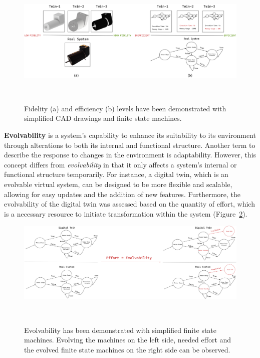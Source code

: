 \documentclass{llncs}
\begin{document}
    \begin{figure}[htbp]
        \centering
        \includegraphics[width = 1\textwidth]{Efficiency and Fidelity.png}
        \caption{Fidelity (a) and efficiency (b) levels have been demonstrated with simplified CAD drawings and 
        finite state machines.}~\label{fig:EfficiencyandFidelity}
    \end{figure}
 
    \textbf{Evolvability} is a system's capability to enhance its suitability to its environment through alterations to both its internal and functional 
    structure\cite{MobusSystemTheory}. Another term to describe the response to changes in the environment is adaptability.
    However, this concept differs from \textit{evolvability} in that it only affects a system's internal or functional structure temporarily. 
    For instance, a digital twin, which is an evolvable virtual system, can be designed to be more flexible and scalable, 
    allowing for easy updates and the addition of new features\cite{ZHANGUPDATEMETHOD}. 
    Furthermore, the evolvability of the digital twin was assessed based on the quantity of effort, which is a necessary resource to initiate transformation
    within the system (Figure~\ref{fig:Evolvability}). 

    \begin{figure}[htbp]
        \includegraphics[width = 1\textwidth]{Evolvability.png}
        \caption{Evolvability has been demonstrated with simplified finite state machines. 
        Evolving the machines on the left side, needed effort 
        and the evolved finite state machines on the right side can be observed.}~\label{fig:Evolvability}
    \end{figure}
\end{document}
